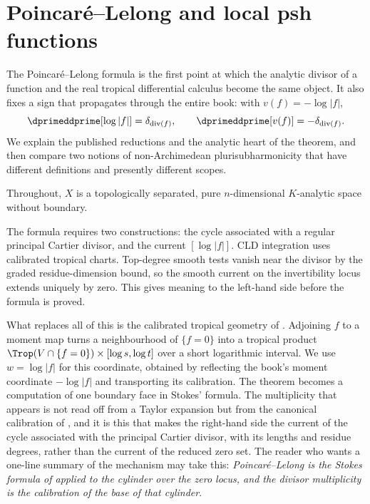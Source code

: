 \chapter{Poincar\'e--Lelong and local psh functions}
\label{chap:cld-poincare-lelong}

The Poincar\'e--Lelong formula is the first point at which the analytic
divisor of a function and the real tropical differential calculus become the
same object.  It also fixes a sign that propagates through the entire book:
with $v(f)=-\log|f|$,
\[
       \dprimeddprime[\log|f|]=\delta_{\operatorname{div}(f)},
       \qquad
       \dprimeddprime[v(f)]=-\delta_{\operatorname{div}(f)}.
\]
We explain the published reductions and the analytic heart of the theorem,
and then compare two notions of non-Archimedean plurisubharmonicity that have
different definitions and presently different scopes.

Throughout, $X$ is a topologically separated, pure $n$-dimensional
$K$-analytic space without boundary.

The formula requires two constructions: the cycle associated with a
regular principal Cartier divisor, and the current $[\log|f|]$. CLD
integration uses calibrated tropical charts. Top-degree smooth tests
vanish near the divisor by the graded residue-dimension bound, so the
smooth current on the invertibility locus extends uniquely by zero.
This gives meaning to the left-hand side before the formula is proved.

What replaces all of this is the calibrated tropical geometry of
.
Adjoining $f$ to a moment map turns a neighbourhood of $\{f=0\}$ into a
tropical product $\Trop(V\cap\{f=0\})\times[\log s,\log t]$ over a short
logarithmic interval. We use $w=\log|f|$ for this coordinate, obtained by
reflecting the book's moment coordinate $-\log|f|$ and transporting its
calibration. The
theorem becomes a computation of one boundary face in Stokes' formula.  The
multiplicity that appears is not read off from a Taylor expansion but from
the canonical calibration of , and it is
this that makes the right-hand side the current of the cycle associated with
the principal Cartier divisor, with its lengths and residue degrees, rather
than the current of the reduced zero set.  The reader who wants a one-line
summary of the mechanism
may take this: \emph{Poincar\'e--Lelong is the Stokes formula of
 applied to the cylinder over the zero
locus, and the divisor multiplicity is the calibration of the base of that
cylinder}.

